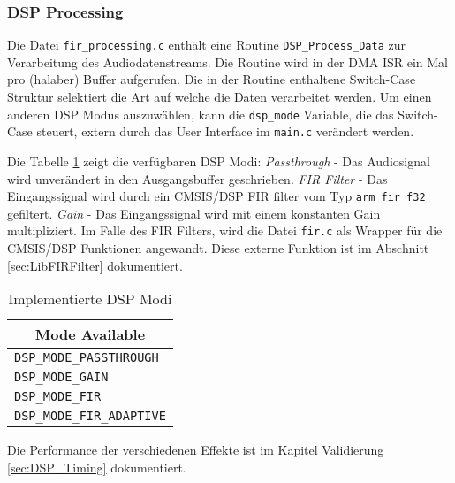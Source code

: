 \subsubsection{DSP Processing}
\label{sec:LibDSPProcessing}

Die Datei \texttt{fir\_processing.c} enthält eine Routine \texttt{DSP\_Process\_Data} zur Verarbeitung des Audiodatenstreams. Die Routine wird in der DMA ISR ein Mal pro (halaber) Buffer aufgerufen.
Die in der Routine enthaltene Switch-Case Struktur selektiert die Art auf welche die Daten verarbeitet werden. 
Um einen anderen DSP Modus auszuwählen, kann die \texttt{dsp\_mode} Variable, die das Switch-Case steuert, extern durch das User Interface im \texttt{main.c} verändert werden.

Die Tabelle \ref{tab:DSP_Modes} zeigt die verfügbaren DSP Modi: \textit{Passthrough} - Das Audiosignal wird unverändert in den Ausgangsbuffer geschrieben. \textit{FIR Filter} - Das Eingangssignal wird durch ein CMSIS/DSP FIR filter vom Typ \texttt{arm\_fir\_f32} gefiltert. \textit{Gain} - Das Eingangssignal wird mit einem konstanten Gain multipliziert.
Im Falle des FIR Filters, wird die Datei \texttt{fir.c} als Wrapper für die CMSIS/DSP Funktionen angewandt. Diese externe Funktion ist im Abschnitt \ref{sec:LibFIRFilter} dokumentiert.

\begin{table}[H]
	\centering
	\begin{tabular}{|l|}
		\hline
		\multicolumn{1}{|c|}{\textbf{Mode Available}} \\ \hline
		\texttt{DSP\_MODE\_PASSTHROUGH}                        \\ \hline
		\texttt{DSP\_MODE\_GAIN}                               \\ \hline
		\texttt{DSP\_MODE\_FIR}                                \\ \hline
		\texttt{DSP\_MODE\_FIR\_ADAPTIVE}                      \\ \hline
	\end{tabular}
	\caption{Implementierte DSP Modi}
	\label{tab:DSP_Modes}
\end{table}

Die Performance der verschiedenen Effekte ist im Kapitel Validierung \ref{sec:DSP_Timing} dokumentiert.



